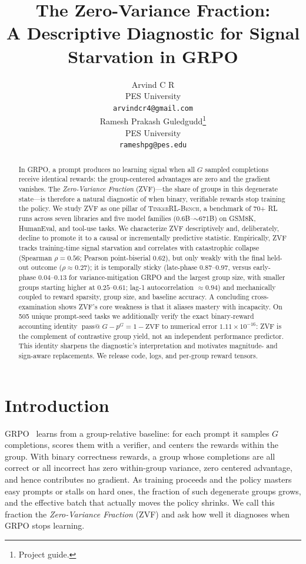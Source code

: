 \documentclass{article}
\title{The Zero-Variance Fraction:\\
       A Descriptive Diagnostic for Signal Starvation in GRPO}
\author{
  Arvind C R \\
  PES University\\
  \texttt{arvindcr4@gmail.com} \\
  \And
  Ramesh Prakash Guledgudd\thanks{Project guide.} \\
  PES University\\
  \texttt{rameshpg@pes.edu} \\
}
\newcommand{\ours}{\textsc{TinkerRL-Bench}}
\begin{document}
\sloppy {}  \hfuzz=2pt
\maketitle
\begin{abstract}
In GRPO, a prompt produces no learning signal when all $G$ sampled completions
receive identical rewards: the group-centered advantages are zero and the gradient
vanishes. The \emph{Zero-Variance Fraction} (ZVF)---the share of groups in this
degenerate state---is therefore a natural diagnostic of when binary, verifiable
rewards stop training the policy. We study ZVF as one pillar of \ours{}, a
benchmark of 70+ RL runs across seven libraries and five model families
($0.6$B--$\sim$671B) on GSM8K, HumanEval, and tool-use tasks. We characterize ZVF
descriptively and, deliberately, decline to promote it to a causal or
incrementally predictive statistic. Empirically, ZVF tracks training-time signal
starvation and correlates with catastrophic collapse (Spearman
$\rho = 0.56$; Pearson point-biserial $0.62$), but only weakly with the final held-out outcome
($\rho \approx 0.27$); it is temporally sticky (late-phase $0.87$--$0.97$, versus
early-phase $0.04$--$0.13$ for variance-mitigation GRPO and the largest group size,
with smaller groups starting higher at $0.25$--$0.61$; lag-1 autocorrelation $\approx 0.94$) and mechanically
coupled to reward sparsity, group size, and baseline accuracy. A concluding
cross-examination shows ZVF's core weakness is that it aliases mastery with
incapacity. On 505 unique prompt-seed tasks we additionally verify the exact
binary-reward accounting identity
$\operatorname{pass@}G-p^G=1-\mathrm{ZVF}$ to numerical error
$1.11\times10^{-16}$: ZVF is the complement of contrastive group yield, not an
independent performance predictor. This identity sharpens the diagnostic's
interpretation and motivates magnitude- and sign-aware replacements. We release code,
logs, and per-group reward tensors.
\end{abstract}
 \section{Introduction}
\label{sec:p2-intro}
GRPO~\citep{shao2024deepseekmath, guo2025deepseekr1} learns from a group-relative
baseline: for each prompt it samples $G$ completions, scores them with a verifier,
and centers the rewards within the group. With binary correctness rewards, a group
whose completions are all correct or all incorrect has zero within-group variance,
zero centered advantage, and hence contributes no gradient. As training proceeds
and the policy masters easy prompts or stalls on hard ones, the fraction of such
degenerate groups grows, and the effective batch that actually moves the policy
shrinks. We call this fraction the \emph{Zero-Variance Fraction} (ZVF) and ask how
well it diagnoses when GRPO stops learning.
\end{document}
